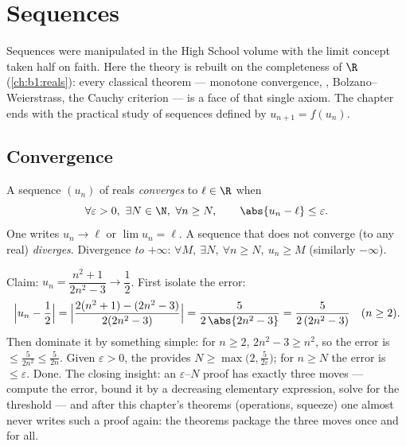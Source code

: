 \chapter{Sequences}\label{ch:b1:seq}

Sequences were manipulated in the High School volume with the limit
concept taken half on faith. Here the theory is rebuilt on the
completeness of $\R$ (\cref{ch:b1:reals}): every classical theorem
--- monotone convergence, , Bolzano--Weierstrass,
the Cauchy criterion --- is a face of that single axiom. The chapter
ends with the practical study of sequences defined by $u_{n+1} =
f(u_n)$.

\section{Convergence}

\begin{definition}\label{def:b1:seq:limit}
A sequence $(u_n)$ of reals \emph{converges} to $\ell \in \R$
when
\[
\forall \varepsilon > 0,\ \exists N \in \N,\ \forall n \geq N,
\qquad \abs{u_n - \ell} \leq \varepsilon .
\]
One writes $u_n \to \ell$ or $\lim u_n = \ell$. A sequence that does
not converge (to any real) \emph{diverges}. Divergence \emph{to
$+\infty$}: $\forall M,\ \exists N,\ \forall n \geq N,\ u_n \geq M$
(similarly $-\infty$).
\end{definition}

\begin{example}\label{ex:b1:seq:epsilonN}
Claim: $u_n = \dfrac{n^2 + 1}{2n^2 - 3} \to \dfrac12$. First
isolate the error:
\[
\Bigl| u_n - \frac12 \Bigr|
= \Bigl| \frac{2(n^2 + 1) - (2n^2 - 3)}{2(2n^2 - 3)} \Bigr|
= \frac{5}{2\,\abs{2n^2 - 3}}
= \frac{5}{2\,(2n^2 - 3)} \quad (n \geq 2).
\]
Then dominate it by something simple: for $n \geq 2$, $2n^2 - 3
\geq n^2$, so the error is $\leq \frac{5}{2n^2} \leq \frac 5{2n}$.
Given $\varepsilon > 0$, the  provides $N \geq
\max\bigl(2, \frac{5}{2\varepsilon}\bigr)$; for $n \geq N$ the
error is $\leq \varepsilon$. Done. The closing insight: an
$\varepsilon$--$N$ proof has exactly three moves --- compute the
error, bound it by a decreasing elementary expression, solve for
the threshold --- and after this chapter's theorems (operations,
squeeze) one almost never writes such a proof again: the theorems
package the three moves once and for all.
\end{example}

